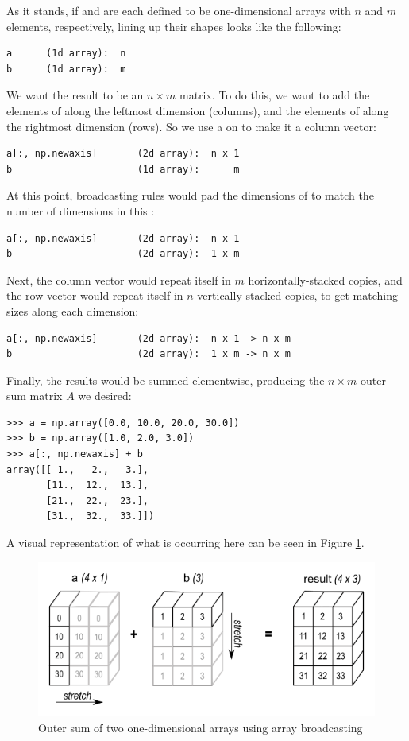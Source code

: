 \begin{itemize}
As it stands, if  and  are each defined to be one-dimensional arrays with $n$ and $m$ elements, respectively, lining up their shapes looks like the following:
\begin{lstlisting}
a	   (1d array):  n
b	   (1d array):  m
\end{lstlisting}
We want the result to be an $n \times m$ matrix.
To do this, we want to add the elements of  along the leftmost dimension (columns), and the elements of  along the rightmost dimension (rows).
So we use a  on  to make it a column vector:
\begin{lstlisting}
a[:, np.newaxis]	   (2d array):  n x 1
b	                   (1d array):      m
\end{lstlisting}
At this point, broadcasting rules would pad the dimensions of  to match the number of dimensions in this :
\begin{lstlisting}
a[:, np.newaxis]	   (2d array):  n x 1
b	                   (2d array):  1 x m
\end{lstlisting}
Next, the column vector  would repeat itself in $m$ horizontally-stacked copies, and the row vector  would repeat itself in $n$ vertically-stacked copies, to get matching sizes along each dimension:
\begin{lstlisting}
a[:, np.newaxis]	   (2d array):  n x 1 -> n x m
b	                   (2d array):  1 x m -> n x m
\end{lstlisting}
Finally, the results would be summed elementwise, producing the $n \times m$ outer-sum matrix $A$ we desired:
\begin{lstlisting}
>>> a = np.array([0.0, 10.0, 20.0, 30.0])
>>> b = np.array([1.0, 2.0, 3.0])
>>> a[:, np.newaxis] + b
array([[ 1.,   2.,   3.],
       [11.,  12.,  13.],
       [21.,  22.,  23.],
       [31.,  32.,  33.]])
\end{lstlisting}

A visual representation of what is occurring here can be seen in Figure \ref{fig:broadcasting4}.
\begin{figure}[H]
    \includegraphics[width=.7\textwidth]{figures/broadcasting_outer.png}
    \caption{Outer sum of two one-dimensional arrays using array broadcasting}
    \label{fig:broadcasting4}
\end{figure}

\end{itemize}

